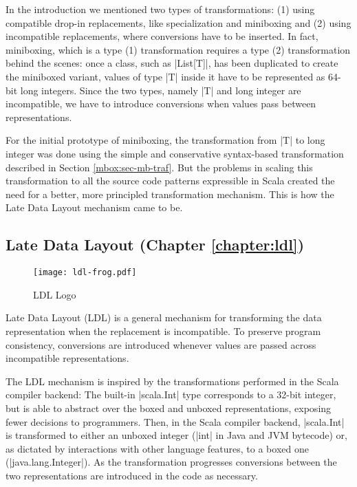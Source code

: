 In the introduction we mentioned two types of transformations: (1) using compatible drop-in replacements, like specialization and miniboxing and (2) using incompatible replacements, where conversions have to be inserted. In fact, miniboxing, which is a type (1) transformation requires a type (2) transformation behind the scenes: once a class, such as |List[T]|, has been duplicated to create the miniboxed variant, values of type |T| inside it have to be represented as 64-bit long integers. Since the two types, namely |T| and long integer are incompatible, we have to introduce conversions when values pass between representations.

For the initial prototype of miniboxing, the transformation from |T| to long integer was done using the simple and conservative syntax-based transformation described in Section \ref{mbox:sec-mb-traf}. But the problems in scaling this transformation to all the source code patterns expressible in Scala created the need for a better, more principled transformation mechanism. This is how the Late Data Layout mechanism came to be.


\subsection{Late Data Layout (Chapter \ref{chapter:ldl})}

\begin{wrapfigure}{r}{40mm}
  \centering
  \vspace{-2em}
  \texttt{[image: ldl-frog.pdf]}
  \vspace{-2em}
  \caption{LDL Logo}
  \vspace{-1em}
\end{wrapfigure}

Late Data Layout (LDL) is a general mechanism for transforming the data representation when the replacement is incompatible. To preserve program consistency, conversions are introduced whenever values are passed across incompatible representations.

The LDL mechanism is inspired by the transformations performed in the Scala compiler backend: The built-in |scala.Int| type corresponds to a 32-bit integer, but is able to abstract over the boxed and unboxed representations, exposing fewer decisions to programmers. Then, in the Scala compiler backend, |scala.Int| is transformed to either an unboxed integer (|int| in Java and JVM bytecode) or, as dictated by interactions with other language features, to a boxed one (|java.lang.Integer|). As the transformation progresses conversions between the two representations are introduced in the code as necessary.

